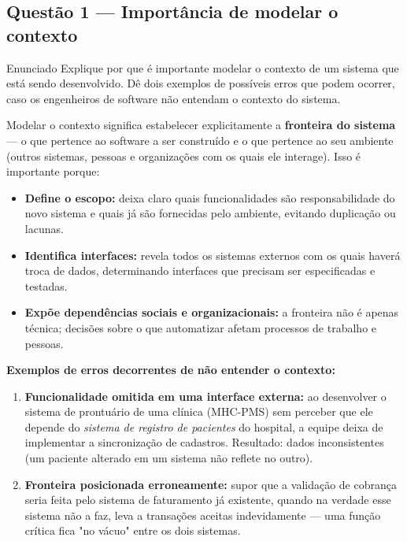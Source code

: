 \documentclass[11pt,a4paper]{article}
\begin{document}
\subsection*{Questão 1 — Importância de modelar o contexto}
\begin{questao}{Enunciado}
Explique por que é importante modelar o contexto de um sistema que está sendo
desenvolvido. Dê dois exemplos de possíveis erros que podem ocorrer, caso os
engenheiros de software não entendam o contexto do sistema.
\end{questao}
\begin{resposta}
Modelar o contexto significa estabelecer explicitamente a \textbf{fronteira do
sistema} — o que pertence ao software a ser construído e o que pertence ao seu
ambiente (outros sistemas, pessoas e organizações com os quais ele interage).
Isso é importante porque:

\begin{itemize}[nosep]
  \item \textbf{Define o escopo:} deixa claro quais funcionalidades são
        responsabilidade do novo sistema e quais já são fornecidas pelo
        ambiente, evitando duplicação ou lacunas.
  \item \textbf{Identifica interfaces:} revela todos os sistemas externos com os
        quais haverá troca de dados, determinando interfaces que precisam ser
        especificadas e testadas.
  \item \textbf{Expõe dependências sociais e organizacionais:} a fronteira não é
        apenas técnica; decisões sobre o que automatizar afetam processos de
        trabalho e pessoas.
\end{itemize}

\textbf{Exemplos de erros decorrentes de não entender o contexto:}
\begin{enumerate}[nosep]
  \item \textbf{Funcionalidade omitida em uma interface externa:} ao desenvolver
        o sistema de prontuário de uma clínica (MHC-PMS) sem perceber que ele
        depende do \emph{sistema de registro de pacientes} do hospital, a equipe
        deixa de implementar a sincronização de cadastros. Resultado: dados
        inconsistentes (um paciente alterado em um sistema não reflete no outro).
  \item \textbf{Fronteira posicionada erroneamente:} supor que a validação de
        cobrança seria feita pelo sistema de faturamento já existente, quando na
        verdade esse sistema não a faz, leva a transações aceitas indevidamente
        — uma função crítica fica "no vácuo" entre os dois sistemas.
\end{enumerate}
\end{resposta}
\end{document}
